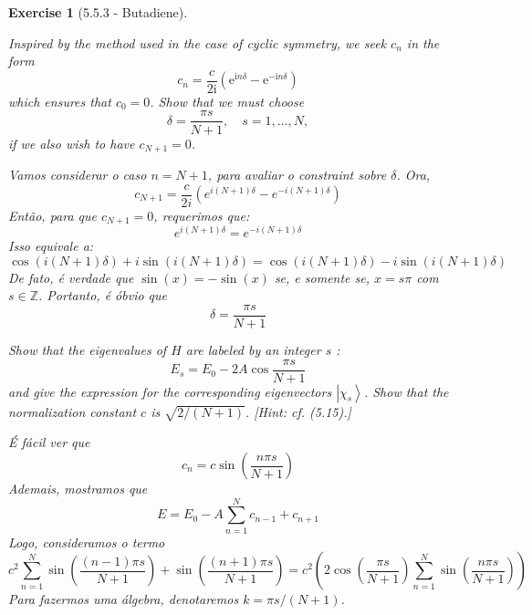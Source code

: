 \documentclass[12pt]{article}
\def\be{\begin{equation}}
\def\ee{\end{equation}}
\def\f{\frac}
\def\l{\left}
\def\r{\right}
\newtheorem{exercise}{Exercise}
\begin{document}
\begin{exercise}[5.5.3 - Butadiene]
\begin{exercises}
			\item Inspired by the method used in the case of cyclic symmetry, we seek $c_{n}$ in the form
			$$
			c_{n}=\frac{c}{2 \mathrm{i}}\left(\mathrm{e}^{\mathrm{i} n \delta}-\mathrm{e}^{-\mathrm{i} n \delta}\right)
			$$
			which ensures that $c_{0}=0$. Show that we must choose
			$$
			\delta=\frac{\pi s}{N+1}, \quad s=1, \ldots, N,
			$$
			if we also wish to have $c_{N+1}=0$. 
			\begin{multianswer}
				Vamos considerar o caso $n=N+1$, para avaliar o constraint sobre $\delta$. Ora,
				\be
					c_{N+1} = \f{c}{2i}\l( e^{i(N+1)\delta} - e^{-i(N+1)\delta}\r)
				\ee
				Então, para que $c_{N+1}=0$, requerimos que:
				\be
					e^{i(N+1)\delta} = e^{-i(N+1)\delta}
				\ee
				Isso equivale a:
				\be
					\cos(i(N+1)\delta) + i\sin(i(N+1)\delta) = \cos(i(N+1)\delta) - i\sin(i(N+1)\delta)
				\ee
				De fato, é verdade que $\sin(x) = -\sin(x)$ se, e somente se, $x=s\pi$ com $s\in\mathbb{Z}$. Portanto, é óbvio que
				\be
					\delta = \f{\pi s}{N+1}
				\ee
			\end{multianswer}
			
			\item Show that the eigenvalues of $H$ are labeled by an integer $s$ :
			$$
			E_{s}=E_{0}-2 A \cos \frac{\pi s}{N+1}
			$$
			and give the expression for the corresponding eigenvectors $\left|\chi_{s}\right\rangle$. Show that the normalization constant $c$ is $\sqrt{2 /(N+1)}$. [Hint: cf. (5.15).]
			\begin{multianswer}
				É fácil ver que
				\be
					c_n = c\sin\l(\f{n\pi s}{N+1}\r)
				\ee
				Ademais, mostramos que
				\be
					E = E_0 - A\sum_{n=1}^{N} c_{n-1} + c_{n+1}
				\ee
				Logo, consideramos o termo
				\be
					c^2\sum_{n=1}^N \sin\l(\f{(n-1)\pi s}{N+1}\r) + \sin\l(\f{(n+1)\pi s}{N+1}\r) = c^2\l( 2\cos\l(\f{\pi s}{N+1}\r) \sum_{n=1}^N \sin\l(\f{ n\pi s}{N+1}\r) \r)
				\ee
				Para fazermos uma álgebra, denotaremos $k=\pi s/(N+1)$. 
				
				
				
			\end{multianswer}
			
		\end{exercises}		
	\end{exercise}
	
\end{document}
